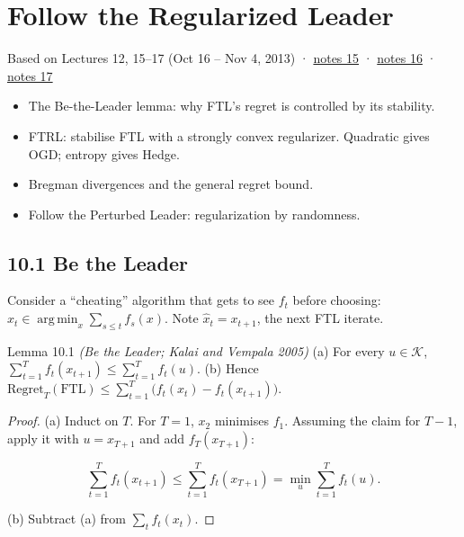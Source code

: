 \documentclass[11pt,a4paper,openany]{book}
\newcommand{\Reg}{\mathrm{Regret}}
\DeclareMathOperator*{\argmin}{arg\,min}
\newcommand{\cK}{\mathcal{K}}
\newcommand{\chapsource}[1]{{\small\sffamily\color{muted}#1\par}\medskip}
\begin{document}
\chapter[Follow the Regularized Leader]{Follow the Regularized Leader}\label{ch10}
\chapsource{Based on Lectures 12, 15–17 (Oct 16 – Nov 4, 2013) · \href{https://web.eecs.umich.edu/~jabernet/eecs598course/fall2013/web/notes/lec15_102813.pdf}{notes 15} · \href{https://web.eecs.umich.edu/~jabernet/eecs598course/fall2013/web/notes/lec16_103013.pdf}{notes 16} · \href{https://web.eecs.umich.edu/~jabernet/eecs598course/fall2013/web/notes/lec17_110413.pdf}{notes 17}}

\begin{goals}
\begin{itemize}
\item The Be-the-Leader lemma: why FTL's regret is controlled by its stability.
\item FTRL: stabilise FTL with a strongly convex regularizer. Quadratic gives OGD; entropy gives Hedge.
\item Bregman divergences and the general regret bound.
\item Follow the Perturbed Leader: regularization by randomness.
\end{itemize}
\end{goals}

\section*{10.1 Be the Leader}\label{ch10-btl}

Consider a ``cheating'' algorithm that gets to see $f_t$ before choosing: $\hat x_t\in\argmin_{x}\sum_{s\le t}f_s(x)$. Note $\hat x_t=x_{t+1}$, the next FTL iterate.

\begin{bthm}{Lemma 10.1 \emph{(Be the Leader; Kalai and Vempala 2005)}}
(a) For every $u\in\cK$, $\sum_{t=1}^Tf_t(x_{t+1})\le\sum_{t=1}^Tf_t(u)$.\newline 
(b) Hence $\Reg_T(\mathrm{FTL})\le\sum_{t=1}^T\big(f_t(x_t)-f_t(x_{t+1})\big)$.
\end{bthm}

\begin{proof}
(a) Induct on $T$. For $T=1$, $x_2$ minimises $f_1$. Assuming the claim for $T-1$, apply it with $u=x_{T+1}$ and add $f_T(x_{T+1})$:

\[\sum_{t=1}^{T}f_t(x_{t+1})\le\sum_{t=1}^Tf_t(x_{T+1})=\min_u\sum_{t=1}^Tf_t(u).\]

(b) Subtract (a) from $\sum_tf_t(x_t)$.
\end{proof}
\end{document}
